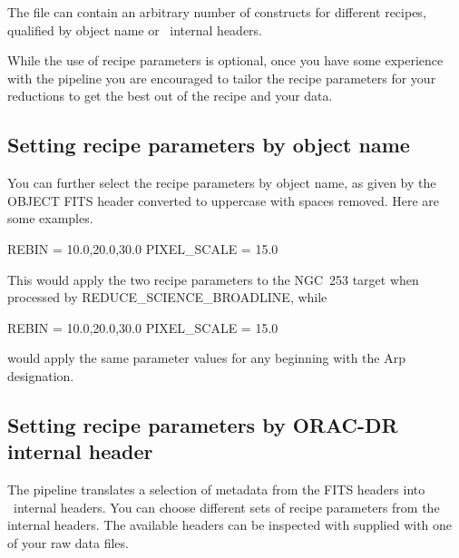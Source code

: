 \documentclass[11pt,oneside,chapters]{starlink}
\begin{document}
The  file can contain an arbitrary number of \param{[]}
constructs for different recipes, qualified by object name or
\oracdr\ internal headers.

While the use of recipe parameters is optional, once you have some
experience with the pipeline you are encouraged to tailor the recipe
parameters for your reductions to get the best out of the recipe and
your data.

\subsection{Setting recipe parameters by object name}
\label{sec:recpars_object}

You can further select the recipe parameters by object name, as given
by the OBJECT FITS header converted to uppercase with spaces removed.
Here are some examples.

\vspace{0.2cm}
\begin{terminalv}
REBIN = 10.0,20.0,30.0
PIXEL_SCALE = 15.0
\end{terminalv}

This would apply the two recipe parameters to the NGC~253 target
when processed by REDUCE\_SCIENCE\_BROADLINE, while

\vspace{0.2cm}
\begin{terminalv}
REBIN = 10.0,20.0,30.0
PIXEL_SCALE = 15.0
\end{terminalv}

would apply the same parameter values for any beginning with the Arp
designation.

\subsection{Setting recipe parameters by ORAC-DR internal header}
\label{sec:recpars_orac}

The pipeline translates a selection of metadata from the FITS headers
into \oracdr\ internal headers.  You can choose different sets of recipe
parameters from the internal headers.  The available headers can be
inspected with  supplied with one of your raw data
files.

\vspace{0.2cm}
\begin{terminalv}
\end{terminalv}
\end{document}
